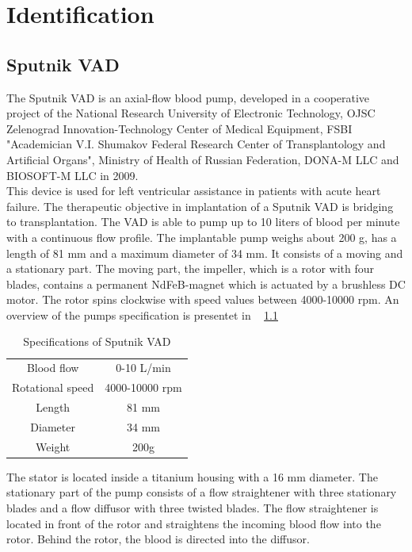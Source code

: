\chapter{Identification}
\section{Sputnik VAD}
The Sputnik VAD is an axial-flow blood pump, developed in a cooperative project of the National Research University of Electronic Technology, OJSC Zelenograd Innovation-Technology Center of Medical Equipment, FSBI "Academician V.I. Shumakov Federal Research Center of Transplantology and Artificial Organs", Ministry of Health of Russian Federation, DONA-M LLC and BIOSOFT-M LLC in 2009. \cite{Sputnik1}
\\This device is used for left ventricular assistance in patients with acute heart failure. The therapeutic objective in implantation of a Sputnik VAD is bridging to transplantation. The VAD is able to pump up to 10 liters of blood per minute with a continuous flow profile. The implantable pump weighs about 200 g, has a length of 81 mm and a maximum diameter of 34 mm. It consists of a moving and a stationary part. The moving part, the impeller, which is a rotor with four blades, contains a permanent NdFeB-magnet which is actuated by a brushless DC motor. The rotor spins clockwise with speed values between 4000-10000 rpm. An overview of the pumps specification is presentet in \tablename~ \ref{tab:sput1}
\begin{table}[h]
  \centering
  \begin{tabular}{c|c}
    \toprule
    Blood flow  & 0-10 L/min \\
    Rotational speed & 4000-10000 rpm \\
    Length & 81 mm \\
    Diameter & 34 mm \\
    Weight & 200g \\
    \bottomrule
\end{tabular}
  \caption{Specifications of Sputnik VAD}
  \label{tab:sput1}
\end{table}
The stator is located inside a titanium housing with a 16 mm diameter. The stationary part of the pump consists of a flow straightener with three stationary blades and a flow diffusor with three twisted blades. The flow straightener is located in front of the rotor and straightens the incoming blood flow into the rotor. Behind the rotor, the blood is directed into the diffusor. %
